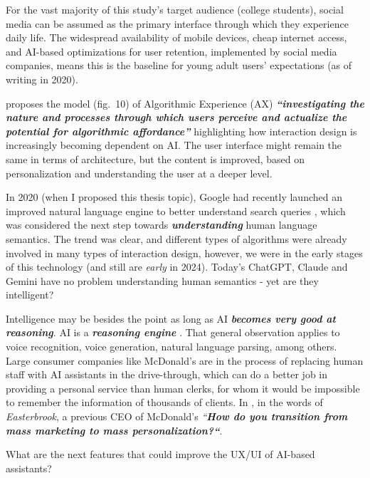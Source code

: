 \documentclass[
  letterpaper,
  DIV=11,
  numbers=noendperiod]{scrartcl}
\begin{document}
For the vast majority of this study's target audience (college
students), social media can be assumed as the primary interface through
which they experience daily life. The widespread availability of mobile
devices, cheap internet access, and AI-based optimizations for user
retention, implemented by social media companies, means this is the
baseline for young adult users' expectations (as of writing in 2020).

\citep{shinUserExperienceWhat2020} proposes the model (fig.~10) of
Algorithmic Experience (AX) \textbf{\emph{``investigating the nature and
processes through which users perceive and actualize the potential for
algorithmic affordance''}} highlighting how interaction design is
increasingly becoming dependent on AI. The user interface might remain
the same in terms of architecture, but the content is improved, based on
personalization and understanding the user at a deeper level.

In 2020 (when I proposed this thesis topic), Google had recently
launched an improved natural language engine to better understand search
queries \citep{UnderstandingSearchesBetter2019}, which was considered
the next step towards \textbf{\emph{understanding}} human language
semantics. The trend was clear, and different types of algorithms were
already involved in many types of interaction design, however, we were
in the early stages of this technology (and still are \emph{early} in
2024). Today's ChatGPT, Claude and Gemini have no problem understanding
human semantics - yet are they intelligent?

Intelligence may be besides the point as long as AI
\textbf{\emph{becomes very good at reasoning}}. AI is a
\textbf{\emph{reasoning engine}}
\citetext{\citealp{shipperGPT4ReasoningEngine2023}; \citealp{bubeckSparksArtificialGeneral2023}; \citealp[see][
for a summary]{baileyAIEducation2023}}. That general observation applies
to voice recognition, voice generation, natural language parsing, among
others. Large consumer companies like McDonald's are in the process of
replacing human staff with AI assistants in the drive-through, which can
do a better job in providing a personal service than human clerks, for
whom it would be impossible to remember the information of thousands of
clients. In \citep{barrettMcDonaldAcquiresMachineLearning2019}, in the
words of \emph{Easterbrook}, a previous CEO of McDonald's
\emph{``\textbf{How do you transition from mass marketing to mass
personalization?{}``}}.

What are the next features that could improve the UX/UI of AI-based
assistants?
\end{document}
